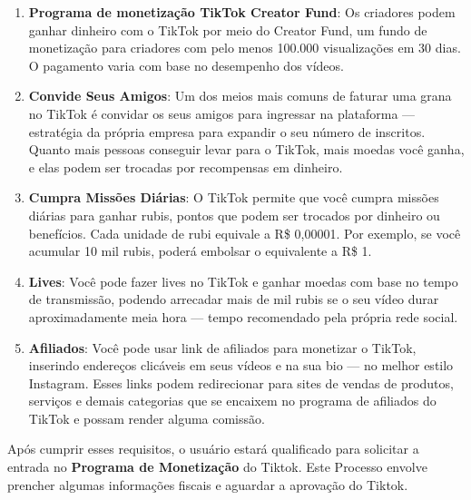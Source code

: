\begin{enumerate}
    \item \textbf{Programa de monetização TikTok Creator Fund}: Os criadores podem ganhar dinheiro com o TikTok por meio do Creator Fund, um fundo de monetização para criadores com pelo menos 100.000 visualizações em 30 dias. O pagamento varia com base no desempenho dos vídeos.

\item \textbf{Convide Seus Amigos}: Um dos meios mais comuns de faturar uma grana no TikTok é convidar os seus amigos para ingressar na plataforma — estratégia da própria empresa para expandir o seu número de inscritos. Quanto mais pessoas conseguir levar para o TikTok, mais moedas você ganha, e elas podem ser trocadas por recompensas em dinheiro.

\item \textbf{Cumpra Missões Diárias}: O TikTok permite que você cumpra missões diárias para ganhar rubis, pontos que podem ser trocados por dinheiro ou benefícios. Cada unidade de rubi equivale a R\$ 0,00001. Por exemplo, se você acumular 10 mil rubis, poderá embolsar o equivalente a R\$ 1.

\item \textbf{Lives}:
Você pode fazer lives no TikTok e ganhar moedas com base no tempo de transmissão, podendo arrecadar mais de mil rubis se o seu vídeo durar aproximadamente meia hora — tempo recomendado pela própria rede social.


\item \textbf{Afiliados}: Você pode usar link de afiliados para monetizar o TikTok, inserindo endereços clicáveis em seus vídeos e na sua bio — no melhor estilo Instagram. Esses links podem redirecionar para sites de vendas de produtos, serviços e demais categorias que se encaixem no programa de afiliados do TikTok e possam render alguma comissão.

\end{enumerate}




Após cumprir esses requisitos, o usuário estará qualificado para solicitar a entrada no \textbf{Programa de Monetização} do Tiktok. Este Processo envolve prencher algumas informações fiscais e aguardar a aprovação do Tiktok.
















